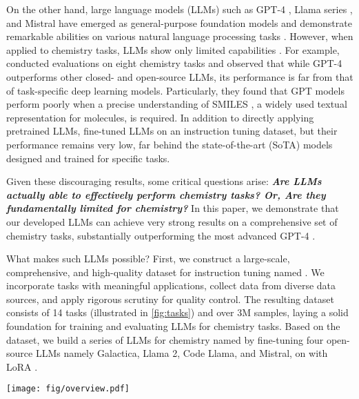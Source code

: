 On the other hand, large language models (LLMs) such as GPT-4 \citep{achiam2023gpt4}, Llama series \citep{touvron2023llama,touvron2023llama2}, and Mistral \citep{jiang2023mistral} have emerged as general-purpose foundation models and demonstrate remarkable abilities on various natural language processing tasks \citep{chang2023survey,thirunavukarasu2023large,yue2023mammoth,zhang2023tablellama,deng2023mindweb}. 
However, when applied to chemistry tasks, LLMs show only limited capabilities \citep{jablonka2022gpt,guo2023what,hatakeyama2023prompt}.
For example, \citet{guo2023what} conducted evaluations on eight chemistry tasks and observed that while GPT-4 outperforms other closed- and open-source LLMs, 
its performance is far from that of task-specific deep learning models. Particularly, they found that GPT models perform poorly when a precise understanding of SMILES \citep{weininger1988smiles}, a widely used textual representation for molecules, is required. 
In addition to directly applying pretrained LLMs, \citet{fang2023mol} fine-tuned LLMs on an instruction tuning dataset, but their performance remains very low, far behind the state-of-the-art (SoTA) models designed and trained for specific tasks.

Given these discouraging results, some critical questions arise: \textit{\textbf{Are LLMs actually able to effectively perform chemistry tasks? Or, Are they fundamentally limited for chemistry?}} %
In this paper, we demonstrate that our developed LLMs can achieve very strong results on a comprehensive set of chemistry tasks, substantially outperforming the most advanced GPT-4 \cite{achiam2023gpt4} .

What makes such LLMs possible? First, we construct a large-scale, comprehensive, and high-quality dataset for instruction tuning named \datasetname. 
We incorporate tasks with meaningful applications, collect data from diverse data sources, and apply rigorous scrutiny for quality control.
The resulting dataset consists of 14 tasks (illustrated in \cref{fig:tasks}) and over 3M samples, laying a solid foundation for training and evaluating LLMs for chemistry tasks.
Based on the dataset, we build a series of LLMs for chemistry named \textbf{\modelname} by fine-tuning four open-source LLMs namely Galactica, Llama 2, Code Llama, and Mistral, on \datasetname with LoRA \citep{hu2021lora}.

\begin{figure*}[t]
\begin{center}
\centerline{
\texttt{[image: fig/overview.pdf]}}
\caption{An overview of tasks in the proposed \datasetname dataset.}
\label{fig:tasks}
\end{center}
\vskip -0.4in
\end{figure*}

